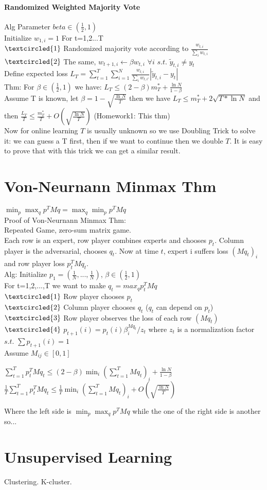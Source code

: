 \documentclass{article}
\begin{document}
\paragraph{Randomized Weighted Majority Vote}
Alg Parameter $beta\in(\frac{1}{2},1)$\\
Initialize $w_{1,i}=1$ For t=1,2...T\\
$\textcircled{1}$ Randomized majority vote according to $\frac{w_{t,i}}{\sum_{i}w_{t,i}}$\\
$\textcircled{2}$ The same, $w_{t+1,i}\leftarrow \beta w_{t,i}$ $\forall i$ $s.t.$ $\tilde{y}_{t,i}\neq y_t$\\
Define expected loss $L_T=\sum_{t=1}^T\sum_{i=1}^N\frac{w_{t,i}}{\sum_{i}w_{t,i'}}|\tilde{y}_{t,i}-y_t|$\\
Thm:  For $\beta\in (\frac{1}{2},1)$ we have: $L_T\leq(2-\beta)m_T^*+\frac{\ln{N}}{1-\beta}$\\
Assume T is known, let $\beta=1-\sqrt{\frac{\ln{N}}{T}}$ then we have $L_T\leq m_T^*+2\sqrt{T*\ln{N}}$ and then $\frac{L_T}{T}\leq \frac{m_T^*}{T}+O(\sqrt{\frac{\ln{N}}{T}})$ (Homework1: This thm)\\
Now for online learning $T$ is usually unknown so we use Doubling Trick to solve it: we can guess a T first, then if we want to continue then we double $T$. It is easy to prove that with this trick we can get a similar result.\\
\section{Von-Neurnann Minmax Thm}
$\min_p\max_q p^TMq=\max_q\min_p p^TMq$\\
Proof of Von-Neurnann Minmax Thm:\\
Repeated Game, zero-sum matrix game.\\
Each row is an expert, row player combines experts and chooses $p_t$. Column player is the adversarial, chooses $q_t$. Now at time $t$, expert i suffers loss $(Mq_t)_i$ and row player loss $p_t^TMq_t$.\\
Alg: Initialize $p_1=(\frac{1}{N},...,\frac{1}{N})$, $\beta\in (\frac{1}{2},1)$\\
For t=1,2,...,T we want to make $q_t=max_qp_t^TMq$\\
$\textcircled{1}$ Row player chooses $p_t$\\
$\textcircled{2}$ Column player chooses $q_t$ ($q_t$ can depend on $p_t$)\\
$\textcircled{3}$ Row player observes the loss of each row $(Mq_t)$\\
$\textcircled{4}$ $p_{t+1}(i)=p_t(i)\beta^{Mq_t}_i/z_t$ where $z_t$ is a normalization factor $s.t.$ $\sum p_{t+1}(i)=1$\\
Assume $M_{ij}\in[0,1]$\\
\begin{center}
$\sum_{t=1}^Tp_t^TMq_t\leq(2-\beta)\min_i(\sum_{t=1}^TMq_t)_i+\frac{\ln{N}}{1-\beta}$
$\frac{1}{T}\sum_{t=1}^Tp_t^TMq_t\leq\frac{1}{T}\min_i(\sum_{t=1}^TMq_t)_i+O(\sqrt{\frac{\ln{N}}{T}})$
\end{center}
Where the left side is $\min_p\max_q p^TMq$ while the one of the right side is another so...\\
\section{Unsupervised Learning}
Clustering. K-cluster.
\end{document}
